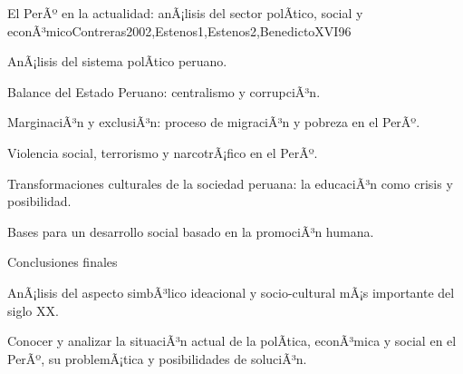 \begin{syllabus}
\begin{unit}{El PerÃº en la actualidad: anÃ¡lisis del sector polÃ­tico, social y econÃ³mico}{Contreras2002,Estenos1,Estenos2,BenedictoXVI}{9}{6}
\begin{topics}
	\item AnÃ¡lisis del sistema polÃ­tico peruano.
	\item Balance del Estado Peruano: centralismo y corrupciÃ³n.
	\item MarginaciÃ³n y exclusiÃ³n: proceso de migraciÃ³n y pobreza en el PerÃº.
	\item Violencia social, terrorismo y narcotrÃ¡fico en el PerÃº.
	\item Transformaciones culturales de la sociedad peruana: la educaciÃ³n como crisis y posibilidad.
	\item Bases para un desarrollo social basado en la promociÃ³n  humana.
	\item Conclusiones finales

	\item AnÃ¡lisis del aspecto simbÃ³lico ideacional y socio-cultural mÃ¡s importante del siglo XX. 

\end{topics}
\begin{unitgoals}
	\item Conocer y analizar la situaciÃ³n actual de la polÃ­tica, econÃ³mica y social en el PerÃº, su problemÃ¡tica y posibilidades de soluciÃ³n.
\end{unitgoals}
\end{unit}



\begin{coursebibliography}
\end{coursebibliography}
\end{syllabus}
